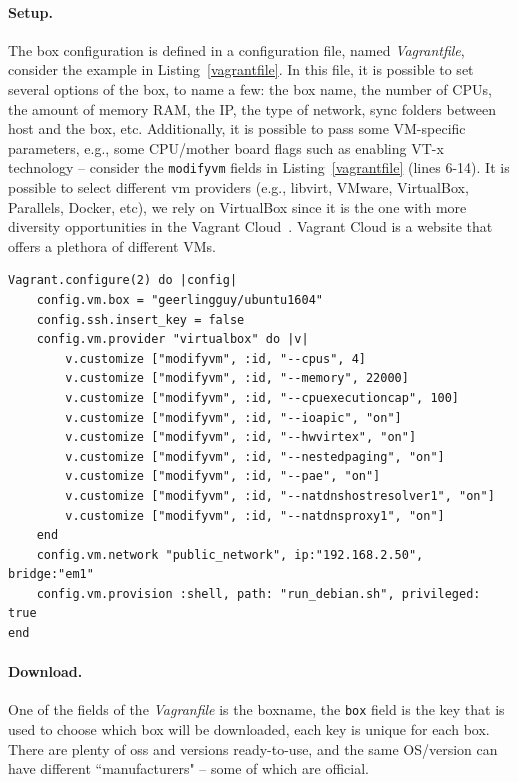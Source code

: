 \paragraph{Setup.}
The box configuration is defined in a configuration file, named \emph{Vagrantfile}, consider the example in Listing~\ref{vagrantfile}.
In this file, it is possible to set several options of the box, to name a few:
the box name, the number of CPUs, the amount of memory RAM, the IP, the type of network, sync folders between host and the box, etc. 
Additionally, it is possible to pass some VM-specific parameters, e.g., some CPU/mother board flags such as enabling VT-x technology -- consider the \texttt{modifyvm} fields in Listing~\ref{vagrantfile} (lines 6-14).
It is possible to select different \gls{vm} providers (e.g., libvirt, VMware, VirtualBox, Parallels, Docker, etc), we rely on VirtualBox since it is the one with more diversity opportunities in the Vagrant Cloud~\cite{vagrantcloud}. 
Vagrant Cloud is a website that offers a plethora of different VMs.

\begin{lstlisting}[style=mystyle,caption=Windows Server 2016 Vagrantfile,label=vagrantfile]
Vagrant.configure(2) do |config|
	config.vm.box = "geerlingguy/ubuntu1604"
	config.ssh.insert_key = false
	config.vm.provider "virtualbox" do |v|
		v.customize ["modifyvm", :id, "--cpus", 4]
		v.customize ["modifyvm", :id, "--memory", 22000]
		v.customize ["modifyvm", :id, "--cpuexecutioncap", 100]
		v.customize ["modifyvm", :id, "--ioapic", "on"]
		v.customize ["modifyvm", :id, "--hwvirtex", "on"]
		v.customize ["modifyvm", :id, "--nestedpaging", "on"]
		v.customize ["modifyvm", :id, "--pae", "on"]
		v.customize ["modifyvm", :id, "--natdnshostresolver1", "on"]
		v.customize ["modifyvm", :id, "--natdnsproxy1", "on"]
	end
	config.vm.network "public_network", ip:"192.168.2.50", bridge:"em1"
	config.vm.provision :shell, path: "run_debian.sh", privileged: true
end
\end{lstlisting}


\paragraph{Download.}
One of the fields of the \emph{Vagranfile} is the boxname, the \texttt{box} field is the key that is used to choose which box will be downloaded, each key is unique for each box.
There are plenty of \glspl{os} and versions ready-to-use, and the same OS/version can have different ``manufacturers" -- some of which are official.

